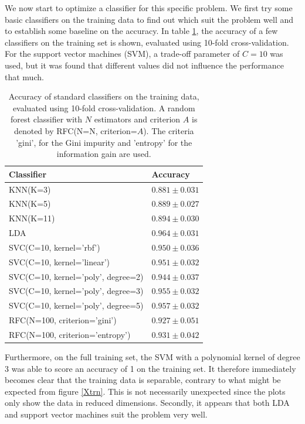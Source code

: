 \documentclass [a4paper] {report}
\begin{document}
	We now start to optimize a classifier for this specific problem. We first try some basic classifiers on the training data to find out which suit the problem well and to establish some baseline on the accuracy. In table \ref{tab:basic}, the accuracy of a few classifiers on the training set is shown, evaluated using 10-fold cross-validation. For the support vector machines (SVM), a trade-off parameter of $C=10$ was used, but it was found that different values did not influence the performance that much.
	
	\begin{table}[H]
		\centering
		\caption{Accuracy of standard classifiers on the training data, evaluated using 10-fold cross-validation. A random forest classifier with $N$ estimators and criterion $A$ is denoted by RFC(N=N, criterion=$A$). The criteria 'gini', for the Gini impurity and 'entropy' for the information gain are used.}
		\label{tab:basic}
		\begin{tabular}{l|l}
			Classifier 							& Accuracy  \\ \hline
			KNN(K=3)						 	& $0.881 \pm 0.031 $\\
			KNN(K=5) 							& $0.889 \pm 0.027 $\\
			KNN(K=11) 							& $0.894 \pm 0.030 $\\
			LDA 								& $0.964 \pm 0.031 $\\
			SVC(C=10, kernel='rbf') 			& $0.950 \pm 0.036 $\\
			SVC(C=10, kernel='linear') 			& $0.951 \pm 0.032 $\\
			SVC(C=10, kernel='poly', degree=2) 	& $0.944 \pm 0.037 $\\
			SVC(C=10, kernel='poly', degree=3) 	& $0.955 \pm 0.032 $\\
			SVC(C=10, kernel='poly', degree=5) 	& $0.957 \pm 0.032 $\\
			RFC(N=100, criterion='gini')		& $0.927 \pm 0.051 $\\
			RFC(N=100, criterion='entropy')		& $0.931 \pm 0.042 $\\
		\end{tabular}		
	\end{table}
	
	\noindent
	Furthermore, on the full training set, the SVM with a polynomial kernel of degree 3 was able to score an accuracy of 1 on the training set. It therefore immediately becomes clear that the training data is separable, contrary to what might be expected from figure \ref{Xtrn}. This is not necessarily unexpected since the plots only show the data in reduced dimensions. Secondly, it appears that both LDA and support vector machines suit the problem very well.\\
	
\end{document}
